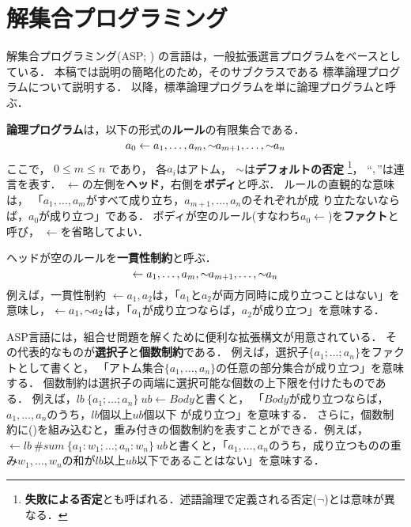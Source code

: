 \chapter{解集合プログラミング}\label{chap:asp}

解集合プログラミング(ASP; \cite{%
  Baral03:cambridge,%
  Gelfond88:iclp,%
  Niemela99:amai,%
  Inoue08:jssst})
の言語は，一般拡張選言プログラムをベースとしている．
本稿では説明の簡略化のため，そのサブクラスである
標準論理プログラムについて説明する．
以降，標準論理プログラムを単に論理プログラムと呼ぶ．

\textbf{論理プログラム}は，以下の形式の\textbf{ルール}の有限集合である．
\begin{equation}
  \label{eq:rule}
  a_0\leftarrow a_1,\dots,a_m,{\sim\!\!{a_{m+1}}},\dots,{\sim\!\!{a_n}}
\end{equation}
ここで，
$0\leq m\leq n$ であり，
各$a_i$はアトム，
${\sim\!\!{}}$は\textbf{デフォルトの否定}
\footnote{\textbf{失敗による否定}とも呼ばれる．述語論理で定義される否定($\neg$)とは意味が異なる．}，
``$,$''は連言を表す．
$\leftarrow$の左側を\textbf{ヘッド}，右側を\textbf{ボディ}と呼ぶ．
ルールの直観的な意味は，
「$a_1,\ldots,a_m$がすべて成り立ち，$a_{m+1},\ldots,a_n$のそれぞれが成
り立たないならば，$a_0$が成り立つ」である．
ボディが空のルール(すなわち\(a_0\leftarrow\))を\textbf{ファクト}と呼び，
$\leftarrow$を省略してよい．

ヘッドが空のルールを\textbf{一貫性制約}と呼ぶ．
\begin{equation}
  \label{eq:constr}
  \leftarrow a_1,\dots,a_m,{\sim\!\!{a_{m+1}}},\dots,{\sim\!\!{a_n}}
\end{equation}
例えば，一貫性制約
\(\leftarrow a_1,a_2\)は，「$a_1$と$a_2$が両方同時に成り立つことはない」を意味し，
\(\leftarrow a_1, {\sim\!\!{a_{2}}}\)は，「$a_1$が成り立つならば，$a_2$が成り立つ」を意味する．

ASP言語には，組合せ問題を解くために便利な拡張構文が用意されている．
その代表的なものが\textbf{選択子}と\textbf{個数制約}である．
例えば，選択子\(\{a_1;\dots;a_n\}\)をファクトとして書くと，
「アトム集合\(\{a_1,\dots,a_n\}\)の任意の部分集合が成り立つ」を意味する．
個数制約は選択子の両端に選択可能な個数の上下限を付けたものである．
例えば，\(lb\ \{a_1;\dots;a_n\}\ ub \leftarrow Body\)と書くと，
「$Body$が成り立つならば，$a_1,\dots,a_n$のうち，$lb$個以上$ub$個以下
が成り立つ」を意味する．
さらに，個数制約に()を組み込むと，重み付きの個数制約を表すことができる．例えば，\( \leftarrow lb\ \#sum\ \{a_1:w_1;\dots;a_n:w_n\}\ ub \)と書くと，「$a_1,\dots,a_n$のうち，成り立つものの重み$w_1,\dots,w_n$の和が$lb$以上$ub$以下であることはない」を意味する．

